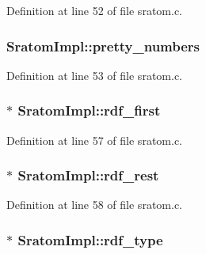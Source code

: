 Definition at line 52 of file sratom.\+c.

\subsubsection[{\texorpdfstring{pretty\+\_\+numbers}{pretty_numbers}}]{ Sratom\+Impl\+::pretty\+\_\+numbers}\hypertarget{struct_sratom_impl_a5c1a8e516e8bf31d70d19a0b5c2cfb3b}{}\label{struct_sratom_impl_a5c1a8e516e8bf31d70d19a0b5c2cfb3b}


Definition at line 53 of file sratom.\+c.

\subsubsection[{\texorpdfstring{rdf\+\_\+first}{rdf_first}}]{$\ast$ Sratom\+Impl\+::rdf\+\_\+first}\hypertarget{struct_sratom_impl_ab217a428cbf5c6712b07e401a389a5ed}{}\label{struct_sratom_impl_ab217a428cbf5c6712b07e401a389a5ed}


Definition at line 57 of file sratom.\+c.

\subsubsection[{\texorpdfstring{rdf\+\_\+rest}{rdf_rest}}]{$\ast$ Sratom\+Impl\+::rdf\+\_\+rest}\hypertarget{struct_sratom_impl_ac22e7aa34a09b5060f0f7097cc30dead}{}\label{struct_sratom_impl_ac22e7aa34a09b5060f0f7097cc30dead}


Definition at line 58 of file sratom.\+c.

\subsubsection[{\texorpdfstring{rdf\+\_\+type}{rdf_type}}]{$\ast$ Sratom\+Impl\+::rdf\+\_\+type}\hypertarget{struct_sratom_impl_a2daf6cb2e9c142fc44c70ab794e5e015}{}\label{struct_sratom_impl_a2daf6cb2e9c142fc44c70ab794e5e015}


